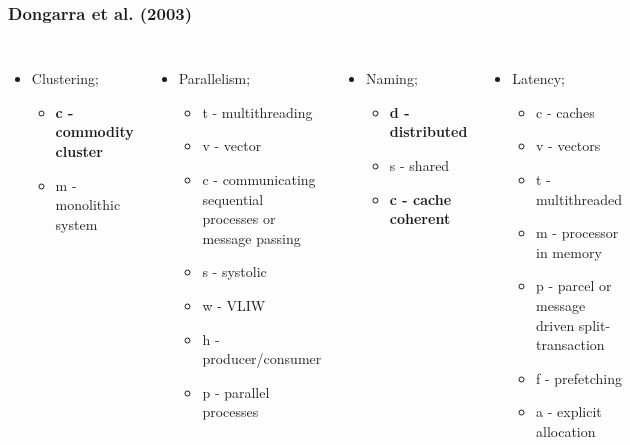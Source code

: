\documentclass{beamer}
\begin{document}
\begin{frame}
  \frametitle{Dongarra et al. (2003)}

  \begin{columns}
    \begin{itemize}
      \item Clustering;
            \begin{itemize}
              \item \textbf{c - commodity cluster}
              \item m - monolithic system
            \end{itemize}
    \end{itemize}

    \begin{itemize}
      \item Parallelism;
            \begin{itemize}
              \item t - multithreading
              \item v - vector
              \item c - communicating sequential processes or message passing
              \item s - systolic
              \item w - VLIW
              \item h - producer/consumer
              \item p - parallel processes
            \end{itemize}
    \end{itemize}

    \begin{itemize}
      \item Naming;
            \begin{itemize}
              \item \textbf{d - distributed}
              \item s - shared
              \item \textbf{c - cache coherent}
            \end{itemize}
    \end{itemize}

    \begin{itemize}
      \item Latency;
            \begin{itemize}
              \item c - caches
              \item v - vectors
              \item t - multithreaded
              \item m - processor in memory
              \item p - parcel or message driven split-transaction
              \item f - prefetching
              \item a - explicit allocation
            \end{itemize}
    \end{itemize}
  \end{columns}
\end{frame}
\end{document}
